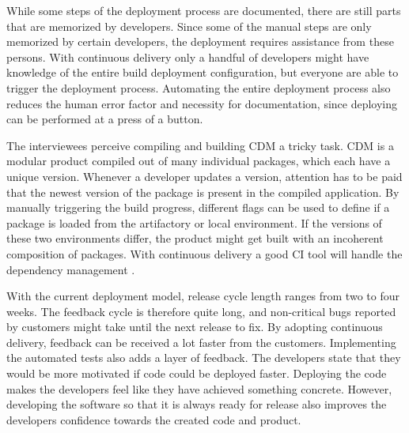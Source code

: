 \documentclass[english]{tktltiki2}
\theoremstyle{definition}
\theoremstyle{remark}
\begin{document}
While some steps of the deployment process are documented, there are still parts that are memorized by developers. Since some of the manual steps are only memorized by certain developers, the deployment requires assistance from these persons. With continuous delivery only a handful of developers might have knowledge of the entire build deployment configuration, but everyone are able to trigger the deployment process. Automating the entire deployment process also reduces the human error factor and necessity for documentation, since deploying can be performed at a press of a button. 

The interviewees perceive compiling and building CDM a tricky task. CDM is a modular product compiled out of many individual packages, which each have a unique version. Whenever a developer updates a version, attention has to be paid that the newest version of the package is present in the compiled application. By manually triggering the build progress, different flags can be used to define if a package is loaded from the artifactory or local environment. If the versions of these two environments differ, the product might get built with an incoherent composition of packages. With continuous delivery a good CI tool will handle the dependency management \cite{cdbook}.



With the current deployment model, release cycle length ranges from two to four weeks. The feedback cycle is therefore quite long, and non-critical bugs reported by customers might take until the next release to fix. By adopting continuous delivery, feedback can be received a lot faster from the customers. Implementing the automated tests also adds a layer of feedback. The developers state that they would be more motivated if code could be deployed faster. Deploying the code makes the developers feel like they have achieved something concrete. However, developing the software so that it is always ready for release also improves the developers confidence towards the created code and product.
\end{document}
